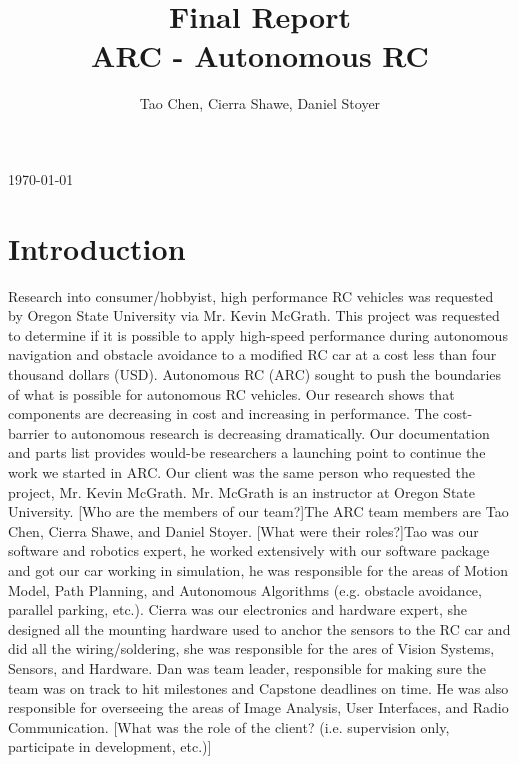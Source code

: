 \documentclass[compsoc,draftclsnofoot,onecolumn,10pt]{IEEEtran}
\date{}
\begin{document}
\begin{titlepage}
	\title{Final Report\\
	ARC - Autonomous RC}
	\author{Tao Chen, Cierra Shawe, Daniel Stoyer}
	\maketitle
	\begin{center}
		\today
	\end{center}

	\thispagestyle{empty} %
	
\end{titlepage}

\tableofcontents

\newpage

\section{Introduction}
Research into consumer/hobbyist, high performance RC vehicles was requested by Oregon State University via Mr. Kevin McGrath. This project was requested to determine if it is possible to apply high-speed performance during autonomous navigation and obstacle avoidance to a modified RC car at a cost less than four thousand dollars (USD). Autonomous RC (ARC) sought to push the boundaries of what is possible for autonomous RC vehicles. Our research shows that components are decreasing in cost and increasing in performance. The cost-barrier to autonomous research is decreasing dramatically. Our documentation and parts list provides would-be researchers a launching point to continue the work we started in ARC. Our client was the same person who requested the project, Mr. Kevin McGrath. Mr. McGrath is an instructor at Oregon State University. [Who are the members of our team?]The ARC team members are Tao Chen, Cierra Shawe, and Daniel Stoyer. [What were their roles?]Tao was our software and robotics expert, he worked extensively with our software package and got our car working in simulation, he was responsible for the areas of Motion Model, Path Planning, and Autonomous Algorithms (e.g. obstacle avoidance, parallel parking, etc.). Cierra was our electronics and hardware expert, she designed all the mounting hardware used to anchor the sensors to the RC car and did all the wiring/soldering, she was responsible for the ares of Vision Systems, Sensors, and Hardware. Dan was team leader, responsible for making sure the team was on track to hit milestones and Capstone deadlines on time. He was also responsible for overseeing the areas of Image Analysis, User Interfaces, and Radio Communication. [What was the role of the client? (i.e. supervision only, participate in development, etc.)]
\newpage
\end{document}
